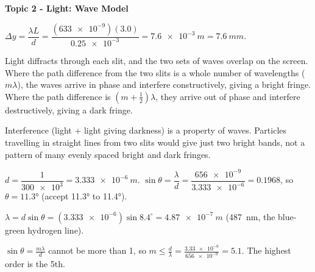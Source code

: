 \documentclass[12pt]{article}
\newcommand\anstopic[1]{\par\Needspace{8\baselineskip}\vspace{4mm}%
  \begin{center}{\headfont\bfseries\fontsize{14}{18}\selectfont #1\par}\end{center}\vspace{2pt}}
\begin{document}
\anstopic{Topic 2 - Light: Wave Model}

\ansq
{}
\begin{crit}
\end{crit}
\sample
$\Delta y = \dfrac{\lambda L}{d} = \dfrac{(\num{633e-9})(3.0)}{\num{0.25e-3}} = \qty{7.6e-3}{m} = \qty{7.6}{mm}$.
\begin{crit}
\end{crit}
\sample
Light diffracts through each slit, and the two sets of waves overlap on the screen. Where the path
difference from the two slits is a whole number of wavelengths ($m\lambda$), the waves arrive in phase and
interfere constructively, giving a bright fringe. Where the path difference is $(m + \frac{1}{2})\lambda$,
they arrive out of phase and interfere destructively, giving a dark fringe.
\begin{crit}
\end{crit}
\sample
Interference (light + light giving darkness) is a property of waves. Particles travelling in straight lines
from two slits would give just two bright bands, not a pattern of many evenly spaced bright and dark
fringes.

\ansq
{}
\begin{crit}
\end{crit}
\sample
$d = \dfrac{1}{\num{300e3}} = \qty{3.333e-6}{m}$. \quad
$\sin\theta = \dfrac{\lambda}{d} = \dfrac{\num{656e-9}}{\num{3.333e-6}} = 0.1968$, so $\theta = \ang{11.3}$
(accept \ang{11.3} to \ang{11.4}).
\begin{crit}
\end{crit}
\sample
$\lambda = d\sin\theta = (\num{3.333e-6})\sin 8.4^\circ = \qty{4.87e-7}{m}$ (\qty{487}{nm}, the blue-green
hydrogen line).
\begin{crit}
\end{crit}
\sample
$\sin\theta = \frac{m\lambda}{d}$ cannot be more than 1, so $m \le \frac{d}{\lambda} = \frac{\num{3.33e-6}}{\num{656e-9}}
= 5.1$. The highest order is the 5th.
\end{document}
